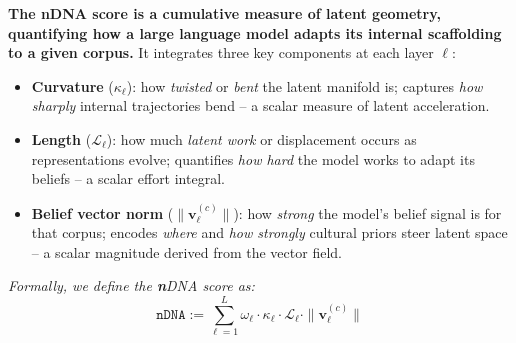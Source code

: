 \vspace{0.8em}

\begin{tcolorbox}[
  colback=blue!3!white,
  colframe=black!80!white,
  boxrule=0.6pt,
  arc=3pt,
  width=\textwidth
]
\small
\textbf{The nDNA score is a cumulative measure of latent geometry, quantifying how a large language model adapts its internal scaffolding to a given corpus.} 
It integrates three key components at each layer $\ell$:
\begin{itemize}[leftmargin=1.5em]
  \item \textbf{Curvature} ($\kappa_\ell$): how \emph{twisted} or \emph{bent} the latent manifold is; captures \emph{how sharply} internal trajectories bend -- a scalar measure of latent acceleration.
  \item \textbf{Length} ($\mathcal{L}_\ell$): how much \emph{latent work} or displacement occurs as representations evolve; quantifies \emph{how hard} the model works to adapt its beliefs -- a scalar effort integral.
  \item \textbf{Belief vector norm} ($\|\mathbf{v}_\ell^{(c)}\|$): how \emph{strong} the model’s belief signal is for that corpus; encodes \emph{where} and \emph{how strongly} cultural priors steer latent space -- a scalar magnitude derived from the vector field.
\end{itemize}
\begin{center}
\emph{Formally, we define the \textbf{\textit{n}}\textnormal{DNA} score as:}
\[\boxed{
\texttt{nDNA} := \sum_{\ell=1}^{L} \omega_\ell \cdot \kappa_\ell \cdot \mathcal{L}_\ell \cdot \| \mathbf{v}_\ell^{(c)} \|}
\]
\end{center}
\end{tcolorbox}



\vspace{0.5em}

